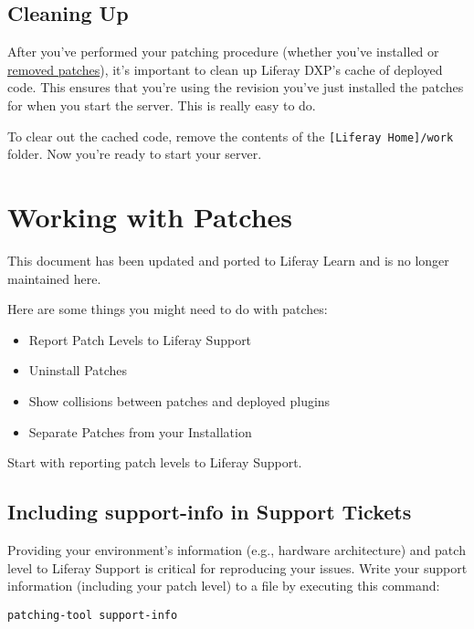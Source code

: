 \section{Cleaning Up}\label{cleaning-up}

After you've performed your patching procedure (whether you've installed
or
\href{/docs/7-2/deploy/-/knowledge_base/d/working-with-patches\#uninstalling-patches}{removed
patches}), it's important to clean up Liferay DXP's cache of deployed
code. This ensures that you're using the revision you've just installed
the patches for when you start the server. This is really easy to do.

To clear out the cached code, remove the contents of the
\texttt{{[}Liferay\ Home{]}/work} folder. Now you're ready to start your
server.

\chapter{Working with Patches}\label{working-with-patches}

{This document has been updated and ported to Liferay Learn and is no
longer maintained here.}

Here are some things you might need to do with patches:

\begin{itemize}
\tightlist
\item
  Report Patch Levels to Liferay Support
\item
  Uninstall Patches
\item
  Show collisions between patches and deployed plugins
\item
  Separate Patches from your Installation
\end{itemize}

Start with reporting patch levels to Liferay Support.

\section{Including support-info in Support
Tickets}\label{including-support-info-in-support-tickets}

Providing your environment's information (e.g., hardware architecture)
and patch level to Liferay Support is critical for reproducing your
issues. Write your support information (including your patch level) to a
file by executing this command:

\begin{verbatim}
patching-tool support-info
\end{verbatim}

